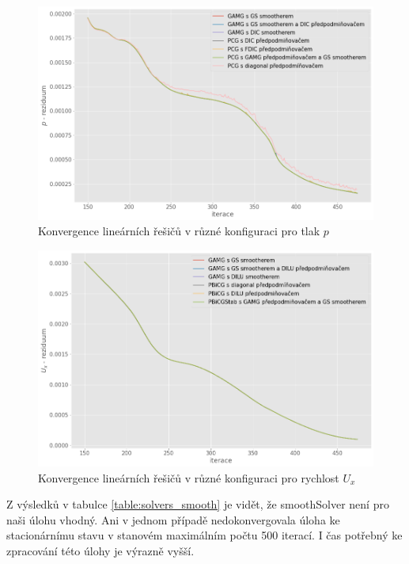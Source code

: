 \documentclass[a4paper,12pt]{report}
\theoremstyle{remark}
\begin{document}
\begin{figure}[H]
	\centering
	\includegraphics[width=1\linewidth]{p-residuum.png}
	\caption{Konvergence lineárních řešičů v různé konfiguraci pro tlak $p$}
	\label{fig:p-residuum}
\end{figure}


\begin{figure}[H]
	\centering
	\includegraphics[width=1\linewidth]{ux-residuum.png}
	\caption{Konvergence lineárních řešičů v různé konfiguraci pro rychlost $U_x$}
	\label{fig:ux-residuum}
\end{figure}

Z výsledků v tabulce \ref{table:solvers_smooth} je vidět, že smoothSolver není pro naši úlohu vhodný. Ani v jednom případě nedokonvergovala úloha ke stacionárnímu stavu v stanovém maximálním počtu 500 iterací.  I čas potřebný ke zpracování této úlohy je výrazně vyšší. 
\end{document}
